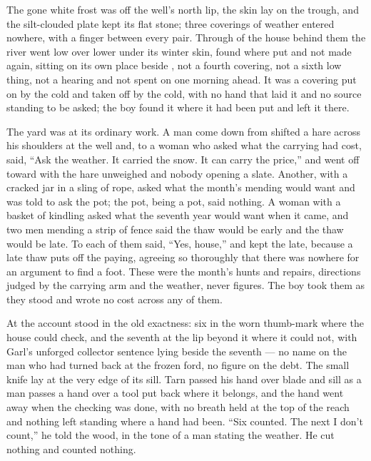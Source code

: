 The gone white frost was off the well's north lip, the skin lay on the trough, and the silt-clouded plate kept its flat stone; three coverings of weather entered nowhere, with a finger between every pair. Through  of the house behind them the river went low over lower under its winter skin, found where put and not made again, sitting on its own place beside , not a fourth covering, not a sixth low thing, not a hearing and not spent on  one morning ahead. It was a covering put on by the cold and taken off by the cold, with no hand that laid it and no source standing to be asked; the boy found it where it had been put and left it there.

The yard was at its ordinary work. A man come down from  shifted a hare across his shoulders at the well and, to a woman who asked what the carrying had cost, said, “Ask the weather. It carried the snow. It can carry the price,” and went off toward  with the hare unweighed and nobody opening a slate. Another, with a cracked jar in a sling of rope, asked what the month's mending would want and was told to ask the pot; the pot, being a pot, said nothing. A woman with a basket of kindling asked what the seventh year would want when it came, and two men mending a strip of fence said the thaw would be early and the thaw would be late. To each of them  said, “Yes, house,” and kept the late, because a late thaw puts off the paying, agreeing so thoroughly that there was nowhere for an argument to find a foot. These were the month's hunts and repairs, directions judged by the carrying arm and the weather, never figures. The boy took them as they stood and wrote no cost across any of them.

\scenebreak

At  the account stood in the old exactness: six in the worn thumb-mark where the house could check, and the seventh at the lip beyond it where it could not, with Garl's unforged collector sentence lying beside the seventh --- no name on the man who had turned back at the frozen ford, no figure on the debt. The small knife lay at the very edge of its sill. Tarn passed his hand over blade and sill as a man passes a hand over a tool put back where it belongs, and the hand went away when the checking was done, with no breath held at the top of the reach and nothing left standing where a hand had been. “Six counted. The next I don't count,” he told the wood, in the tone of a man stating the weather. He cut nothing and counted nothing.

